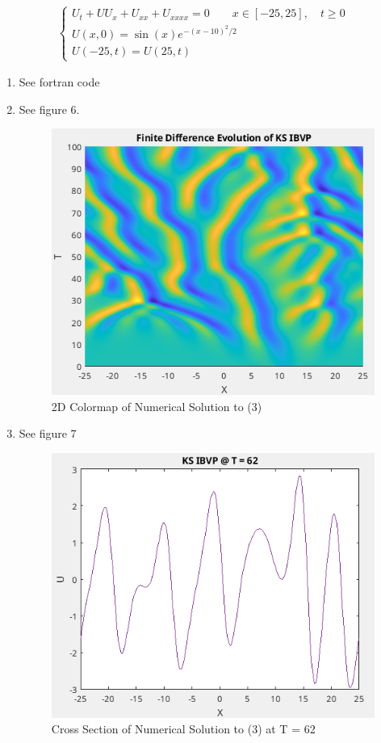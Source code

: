 \documentclass{article}
\begin{document}
    \begin{align}
        \begin{cases}
            U_t +UU_{x} + U_{xx} + U_{xxxx}=0 \quad \quad x \in [-25, 25],
            \quad t \ge 0\\
            U(x,0) = \sin(x)e^{-(x-10)^2/2}\\
            U(-25,t) = U(25,t)
        \end{cases} 
    \end{align}


\begin{enumerate}[label=\alph*)]

    \item See fortran code

    \item See figure 6.
    \begin{figure}[ht]
        \centering
        \includegraphics[width=.5\textwidth]{q3_colormap.png}
        \caption{2D Colormap of Numerical Solution to (3)}
    \end{figure}

    \item See figure 7
    \begin{figure}[ht]
        \centering
        \includegraphics[width=.5\textwidth]{q3t62.png}
        \caption{Cross Section of Numerical Solution to (3) at T = 62}
    \end{figure}

\end{enumerate}
\end{document}
